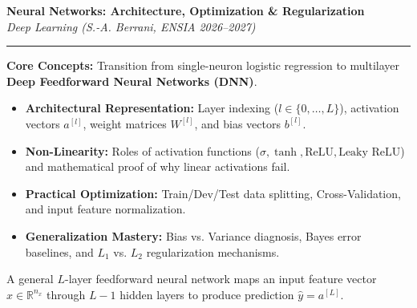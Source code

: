 \documentclass[10pt,a4paper]{article}
\begin{document}

\begin{center}
    {\LARGE\bfseries\color{themeblue} Neural Networks: Architecture, Optimization \& Regularization}\\[1.5pt]
    {\small\itshape Deep Learning (S.-A. Berrani, ENSIA 2026--2027)}\\[1.5pt]
    \textcolor{themeblue}{\rule{\textwidth}{0.5pt}}
\end{center}

\vspace{-12pt}

\begin{tcolorbox}[
    colframe=themeblue,
    colback=lightbg,
    coltitle=white,
    fonttitle=\bfseries\sffamily\small,
    title={Lecture Scope \& Key Themes},
    arc=1.3mm,
    boxrule=0.5pt,
    left=5pt, right=5pt, top=2pt, bottom=2pt
]
\footnotesize
\textbf{Core Concepts:} Transition from single-neuron logistic regression to multilayer \textbf{Deep Feedforward Neural Networks (DNN)}.
\begin{itemize}[leftmargin=10pt, itemsep=0pt, topsep=0pt]
    \item \textbf{Architectural Representation:} Layer indexing ($l \in \{0, \dots, L\}$), activation vectors $a^{[l]}$, weight matrices $W^{[l]}$, and bias vectors $b^{[l]}$.
    \item \textbf{Non-Linearity:} Roles of activation functions ($\sigma, \tanh, \text{ReLU}, \text{Leaky ReLU}$) and mathematical proof of why linear activations fail.
    \item \textbf{Practical Optimization:} Train/Dev/Test data splitting, Cross-Validation, and input feature normalization.
    \item \textbf{Generalization Mastery:} Bias vs. Variance diagnosis, Bayes error baselines, and $L_1$ vs. $L_2$ regularization mechanisms.
\end{itemize}
\end{tcolorbox}

\vspace{-4pt}

\par\vspace{1pt}
A general $L$-layer feedforward neural network maps an input feature vector $x \in \mathbb{R}^{n_x}$ through $L-1$ hidden layers to produce prediction $\hat{y} = a^{[L]}$.
\end{document}
